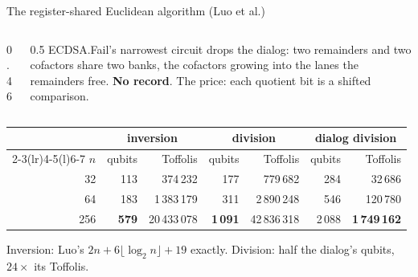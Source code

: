 \documentclass[aspectratio=169,11pt]{beamer}
\begin{document}
\setcounter{framenumber}{189}
\begin{frame}{The register-shared Euclidean algorithm (Luo et al.)}
  \begin{columns}[c]
    \begin{column}{0.46\textwidth}
      \centering
    \end{column}
    \begin{column}{0.5\textwidth}
      \small ECDSA.Fail's narrowest circuit drops the dialog: two remainders and two cofactors share two banks, the cofactors growing into the lanes the remainders free. \textbf{No record}.
      \vskip2mm
      The price: each quotient bit is a shifted comparison.
    \end{column}
  \end{columns}
  \vskip1.5mm
  \centering\footnotesize
  \renewcommand{\arraystretch}{1.05}
  \begin{tabular}{@{}rrrrrrr@{}}
    \toprule
    & \multicolumn{2}{c}{inversion} & \multicolumn{2}{c}{division} & \multicolumn{2}{c}{dialog division} \\
    \cmidrule(lr){2-3}\cmidrule(lr){4-5}\cmidrule(l){6-7}
    $n$ & qubits & Toffolis & qubits & Toffolis & qubits & Toffolis \\
    \midrule
    32 & 113 & 374\,232 & 177 & 779\,682 & 284 & 32\,686 \\
    64 & 183 & 1\,383\,179 & 311 & 2\,890\,248 & 546 & 120\,780 \\
    256 & \textbf{579} & 20\,433\,078 & \textbf{1\,091} & 42\,836\,318 & 2\,088 & \textbf{1\,749\,162} \\
    \bottomrule
  \end{tabular}\par
  \vskip1mm
  {\small Inversion: Luo's $2n+6\lfloor\log_2n\rfloor+19$ exactly. Division: half the dialog's qubits, $24\times$ its Toffolis.}
\end{frame}
\end{document}
